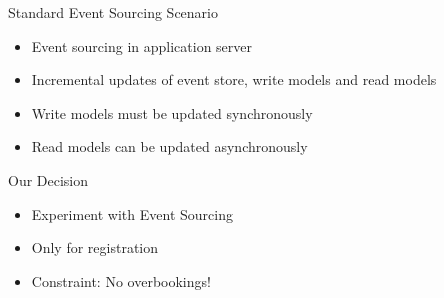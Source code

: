 \begin{frame}[fragile]{Standard Event Sourcing Scenario}

\begin{itemize}
\item Event sourcing in application server
\item Incremental updates of event store, write models and read models
\item Write models must be updated synchronously
\item Read models can be updated asynchronously
\end{itemize}

\end{frame}

\begin{frame}[fragile]{Our Decision}

\begin{itemize}
\item Experiment with Event Sourcing
\item Only for registration
\item Constraint: No overbookings!
\end{itemize}

\end{frame}


